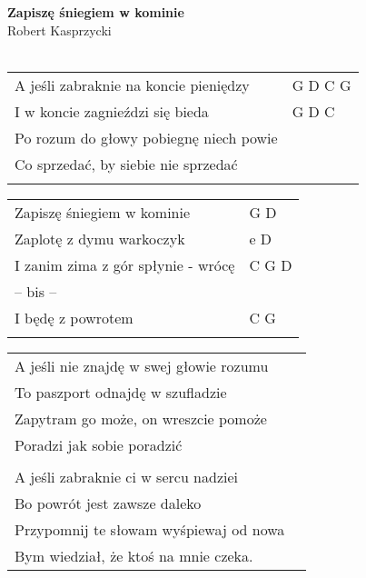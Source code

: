\documentclass[a5paper]{article}
\begin{document}


\noindent
\fontsize{12pt}{15pt}\selectfont
\textbf{Zapiszę śniegiem w kominie} \\
\fontsize{8pt}{10pt}\selectfont
Robert Kasprzycki \\ \\
\fontsize{10pt}{12pt}\selectfont
{}
\begin{tabular}{@{}p{8.00cm}p{3cm}@{}}
\noindent
A jeśli zabraknie na koncie pieniędzy & G D C G \\
I w koncie zagnieździ się bieda	& G D C \\
Po rozum do głowy pobiegnę niech powie \\
Co sprzedać, by siebie nie sprzedać \\ \\
\end{tabular}

\noindent
\begin{tabular}{@{}p{7.00cm}p{3cm}@{}}
Zapiszę śniegiem w kominie & G D \\
Zaplotę z dymu warkoczyk & e D \\
I zanim zima z gór spłynie - wrócę & C G D \\
-- bis -- \\
I będę z powrotem & C G \\ \\
\end{tabular}

\noindent
\begin{tabular}{@{}p{7.00cm}p{3cm}@{}}
A jeśli nie znajdę w swej głowie rozumu \\
To paszport odnajdę w szufladzie \\
Zapytram go może, on wreszcie pomoże \\
Poradzi jak sobie poradzić \\ \\

A jeśli zabraknie ci w sercu nadziei \\
Bo powrót jest zawsze daleko \\
Przypomnij te słowam wyśpiewaj od nowa \\
Bym wiedział, że ktoś na mnie czeka.
\end{tabular}
\end{document}
